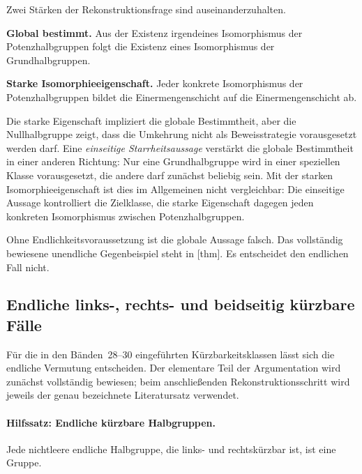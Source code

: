 \documentclass[main.tex]{subfiles}
\begin{document}
Zwei Stärken der Rekonstruktionsfrage sind auseinanderzuhalten.

\smallskip
\noindent\textbf{Global bestimmt.}
Aus der Existenz irgendeines Isomorphismus der Potenzhalbgruppen folgt die
Existenz eines Isomorphismus der Grundhalbgruppen.

\smallskip
\noindent\textbf{Starke Isomorphieeigenschaft.}
Jeder konkrete Isomorphismus der Potenzhalbgruppen bildet die
Einermengenschicht auf die Einermengenschicht ab.

\smallskip
Die starke Eigenschaft impliziert die globale Bestimmtheit, aber die
Nullhalbgruppe zeigt, dass die Umkehrung nicht als Beweisstrategie vorausgesetzt
werden darf.  Eine \emph{einseitige Starrheitsaussage} verstärkt die globale
Bestimmtheit in einer anderen Richtung: Nur eine Grundhalbgruppe wird in
einer speziellen Klasse vorausgesetzt, die andere darf zunächst beliebig
sein.  Mit der starken Isomorphieeigenschaft ist dies im Allgemeinen nicht
vergleichbar: Die einseitige Aussage kontrolliert die Zielklasse, die starke
Eigenschaft dagegen jeden konkreten Isomorphismus zwischen
Potenzhalbgruppen.

Ohne Endlichkeitsvoraussetzung ist die globale Aussage falsch.  Das
vollständig bewiesene unendliche Gegenbeispiel steht in
[thm].  Es entscheidet den
endlichen Fall nicht.

\subsection{Endliche links-, rechts- und beidseitig kürzbare Fälle}

Für die in den Bänden~28--30 eingeführten Kürzbarkeitsklassen lässt sich die
endliche Vermutung entscheiden.  Der elementare Teil der Argumentation wird
zunächst vollständig bewiesen; beim anschließenden Rekonstruktionsschritt
wird jeweils der genau bezeichnete Literatursatz verwendet.

\paragraph{Hilfssatz: Endliche kürzbare Halbgruppen.}
Jede nichtleere endliche Halbgruppe, die links- und rechtskürzbar ist, ist
eine Gruppe.
\end{document}
